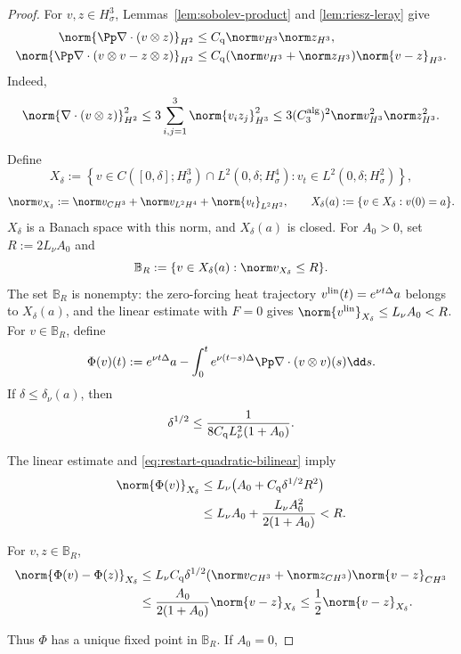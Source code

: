 \begin{proof}
For \(v,z\in H^3_\sigma\), Lemmas~\ref{lem:sobolev-product} and
\ref{lem:riesz-leray} give
\begin{align}
 \norm{\Pp\nabla\cdot(v\otimes z)}_{H^2}
 &\le C_{\rm q}\norm v_{H^3}\norm z_{H^3},
 \label{eq:restart-quadratic-bilinear}\\
 \norm{\Pp\nabla\cdot(v\otimes v-z\otimes z)}_{H^2}
 &\le C_{\rm q}(\norm v_{H^3}+\norm z_{H^3})
 \norm{v-z}_{H^3}.
 \label{eq:restart-quadratic-difference}
\end{align}
Indeed,
\[
 \norm{\nabla\cdot(v\otimes z)}_{H^2}^2
 \le3\sum_{i,j=1}^3\norm{v_i z_j}_{H^3}^2
 \le3(C_3^{\rm alg})^2\norm v_{H^3}^2\norm z_{H^3}^2.
\]

Define
\[
 X_\delta:=
 \left\{v\in C([0,\delta];H^3_\sigma)\cap L^2(0,\delta;H^4_\sigma):
 v_t\in L^2(0,\delta;H^2_\sigma)\right\},
\]
\[
 \norm v_{X_\delta}:=\norm v_{C H^3}
 +\norm v_{L^2H^4}+\norm{v_t}_{L^2H^2},
 \qquad
 X_\delta(a):=\{v\in X_\delta:v(0)=a\}.
\]
\(X_\delta\) is a Banach space with this norm, and \(X_\delta(a)\) is closed.
For \(A_0>0\), set \(R:=2L_\nu A_0\) and
\[
 \mathbb B_R:=\{v\in X_\delta(a):\norm v_{X_\delta}\le R\}.
\]
The set \(\mathbb B_R\) is nonempty: the zero-forcing heat trajectory
\(v^{\rm lin}(t)=e^{\nu t\Delta}a\) belongs to \(X_\delta(a)\), and the
linear estimate with \(F=0\) gives
\(\norm{v^{\rm lin}}_{X_\delta}\le L_\nu A_0<R\).
For \(v\in\mathbb B_R\), define
\[
 \Phi(v)(t):=e^{\nu t\Delta}a
 -\int_0^te^{\nu(t-s)\Delta}
 \Pp\nabla\cdot(v\otimes v)(s)\dd s.
\]
If \(\delta\le\delta_\nu(a)\), then
\[
 \delta^{1/2}\le
 \frac{1}{8C_{\rm q}L_\nu^2(1+A_0)}.
\]
\begin{samepage}
The linear estimate and \eqref{eq:restart-quadratic-bilinear} imply
\begin{align*}
 \norm{\Phi(v)}_{X_\delta}
 &\le L_\nu\bigl(A_0+C_{\rm q}\delta^{1/2}R^2\bigr)\\
 &\le L_\nu A_0+\frac{L_\nu A_0^2}{2(1+A_0)}
 <R.
\end{align*}
\end{samepage}
\begin{samepage}
For \(v,z\in\mathbb B_R\),
\begin{align*}
 \norm{\Phi(v)-\Phi(z)}_{X_\delta}
 &\le L_\nu C_{\rm q}\delta^{1/2}
 (\norm v_{C H^3}+\norm z_{C H^3})
 \norm{v-z}_{C H^3}\\
 &\le\frac{A_0}{2(1+A_0)}\norm{v-z}_{X_\delta}
 \le\frac12\norm{v-z}_{X_\delta}.
\end{align*}
\end{samepage}
Thus \(\Phi\) has a unique fixed point in \(\mathbb B_R\).  If \(A_0=0\),

\end{proof}
